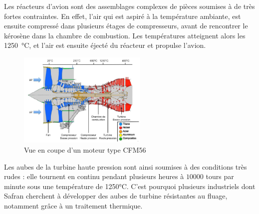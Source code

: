 
Les réacteurs d'avion sont des assemblages complexes de pièces soumises à de
très fortes contraintes. En effet, l'air qui est aspiré à la température 
ambiante, est ensuite compressé dans plusieurs étages de compresseurs, 
avant de rencontrer le kérosène dans la chambre de combustion. Les températures
atteignent alors les \SI{1250}{\celsius}, et l'air est ensuite éjecté du réacteur
et propulse l'avion.


\begin{figure}[H]
    \centering
    \includegraphics[width=0.55\textwidth]{images/coupe_CFM56.png}
    \caption{Vue en coupe d'un moteur type CFM56}
    \label{<label>}
\end{figure}


Les aubes de la turbine haute pression sont ainsi soumises à des conditions très rudes : elle tournent en continu pendant plusieurs heures à $10000$ tours par minute sous une température de 1250°C. C'est pourquoi plusieurs industriels dont Safran cherchent à développer des aubes de turbine résistantes au fluage, notamment grâce à un traitement thermique.


